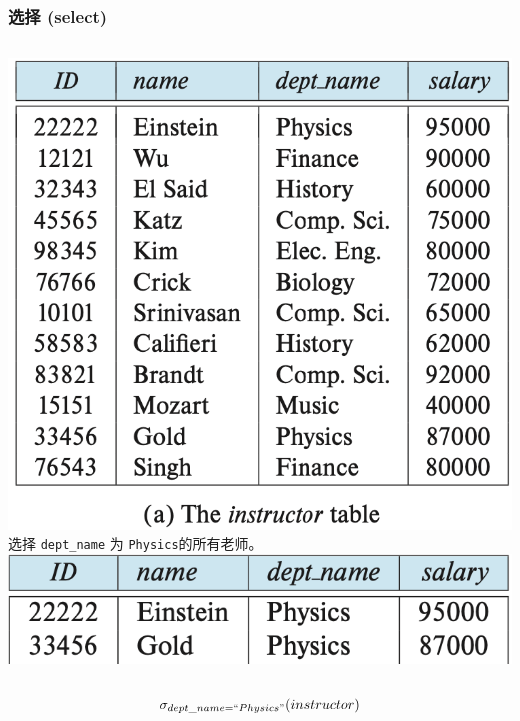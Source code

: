 \documentclass[aspectratio=169, 14pt]{beamer}
\begin{document}
\begin{frame}
	\frametitle{选择 (select)}

	\begin{columns}
		\includegraphics[width=\textwidth]{table/instructor}
		\alert{选择} \texttt{dept\_name} 为 \texttt{Physics}的所有老师。
		\includegraphics[width=\textwidth]{table/select-instructor}


	\end{columns}
	\pause
	\large{\[\sigma_{dept\_name =  ``Physics"}(instructor)\]}

\end{frame}
\end{document}
